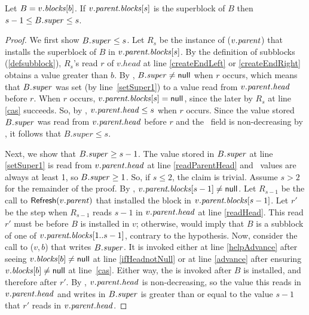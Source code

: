 \begin{lemma}\label{superRelation}
Let $B=v.\mbox{\textnormal{\textit{blocks}}}[b]$.
  If $v.\mbox{\textit{parent.blocks}}[s]$ is the superblock of $B$ then $s-1\leq B.\mbox{\textit{super}}\leq s$.
\end{lemma}
\begin{proof}
We first show $B.\mbox{\textit{super}}\leq s$.
Let $R_s$ be the instance of ($v.\mbox{\textit{parent}}$) that installs the superblock of $B$ 
in $v.\mbox{\textit{parent.blocks}}[s]$.
By the definition of subblocks (\ref{defsubblock}), $R_s$'s read $r$ of $v.head$ at line \ref{createEndLeft} or \ref{createEndRight} obtains a value greater than $b$.
By , $B.\mbox{\textit{super}} \neq \mbox{\sf null}$ when $r$ occurs, which means
that $B.\mbox{\textit{super}}$ was set (by line~\ref{setSuper1}) to a value read from $v.\mbox{\textit{parent}}.\mbox{\textit{head}}$ before $r$.
When $r$ occurs, $v.\mbox{\textit{parent.blocks}}[s] = \mbox{\sf null}$, since the later  by $R_s$ at line
\ref{cas} succeeds.
So, by , $v.\mbox{\textit{parent}}.\mbox{\textit{head}} \leq s$ when $r$ occurs.
Since the value stored $B.\mbox{\textit{super}}$ was read from $v.\mbox{\textit{parent.head}}$ before $r$ and the \head\ field is non-decreasing by , it follows that $B.super\leq s$.

Next, we show that $B.\mbox{\textit{super}}\geq s-1$.
The value stored in $B.\mbox{\textit{super}}$ at line \ref{setSuper1} is read from $v.\mbox{\textit{parent}}.\mbox{\textit{head}}$ at line \ref{readParentHead} and \head\ values are always at least 1, so $B.\mbox{\textit{super}} \geq 1$.
So, if $s\leq 2$, the claim is trivial.  Assume $s>2$ for the remainder of the proof.
By , $v.\mbox{\textit{parent.blocks}}[s-1]\neq \mbox{\sf null}$.  Let $R_{s-1}$ be the call to
${\sf Refresh}(v.\mbox{\textit{parent}})$ that installed the block in $v.\mbox{\textit{parent.blocks}}[s-1]$.
Let $r'$ be the step when $R_{s-1}$ reads $s-1$ in $v.\mbox{\textit{parent}}.\mbox{\textit{head}}$ at line \ref{readHead}.
This read $r'$ must be before $B$ is installed in $v$;
otherwise,  would imply that $B$ is a subblock of one of 
$v.\mbox{\textit{parent.blocks}}[1..s-1]$, contrary to the hypothesis.
Now, consider the call to ($v, b$) that writes $B.\mbox{\textit{super}}$.
It is invoked either 
at line \ref{helpAdvance} after seeing $v.\mbox{\textit{blocks}}[b]\neq \mbox{\sf null}$ at line \ref{ifHeadnotNull}
or at line \ref{advance} after ensuring $v.\mbox{\textit{blocks}}[b]\neq \mbox{\sf null}$ at line~\ref{cas}.
Either way, the  is invoked after $B$ is installed, and therefore after $r'$.
By , $v.\mbox{\textit{parent}}.\mbox{\textit{head}}$ is non-decreasing, so 
the value this  reads in $v.\mbox{\textit{parent}}.\mbox{\textit{head}}$ and
writes in $B.\mbox{\textit{super}}$ is greater than or equal to the value $s-1$ that $r'$ reads in $v.\mbox{\textit{parent}}.\mbox{\textit{head}}$.
\end{proof}


